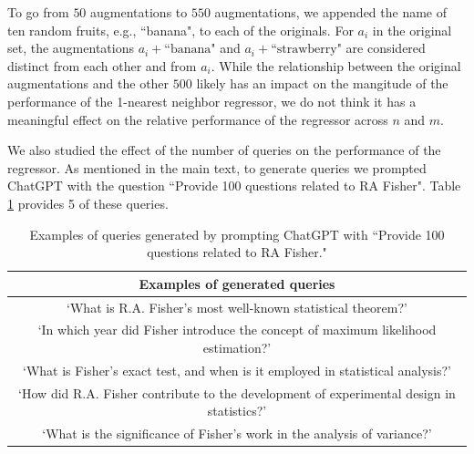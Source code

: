 \documentclass[11pt]{article}
\begin{document}
To go from $ 50 $ augmentations to $ 550 $ augmentations, we appended the name of ten random fruits, e.g., ``banana", to each of the originals.
For $ a_{i} $ in the original set, the augmentations $ a_{i} + \text{``banana"} $ and $ a_{i} + \text{``strawberry"} $ are considered distinct from each other and from $ a_{i} $. 
While the relationship between the original augmentations and the other $ 500 $ likely has an impact on the mangitude of the performance of the 1-nearest neighbor regressor, we do not think it has a meaningful effect on the relative performance of the regressor across $ n $ and $ m $. 

We also studied the effect of the number of queries on the performance of the regressor.
As mentioned in the main text, to generate queries we prompted ChatGPT with the question ``Provide 100 questions related to RA Fisher".
Table \ref{tab:queries} provides 5 of these queries.


\begin{table}[h]
    \centering
    \begin{tabular}{|c|}
\hline
\textbf{Examples of generated queries} \\ \hline \hline
`What is R.A. Fisher's most well-known statistical theorem?' \\ \hline
\multirow{2}{0.8\linewidth}{`In which year did Fisher introduce the concept of maximum likelihood estimation?'} \\ \\ \hline
`What is Fisher's exact test, and when is it employed in statistical analysis?' \\ \hline
\multirow{2}{0.8\linewidth}{`How did R.A. Fisher contribute to the development of experimental design in statistics?'} \\ \\ \hline
`What is the significance of Fisher's work in the analysis of variance?' \\ \hline
    \end{tabular}
    \caption{Examples of queries generated by prompting ChatGPT with ``Provide 100 questions related to RA Fisher."}
    \label{tab:queries}
\end{table}





\end{document}
